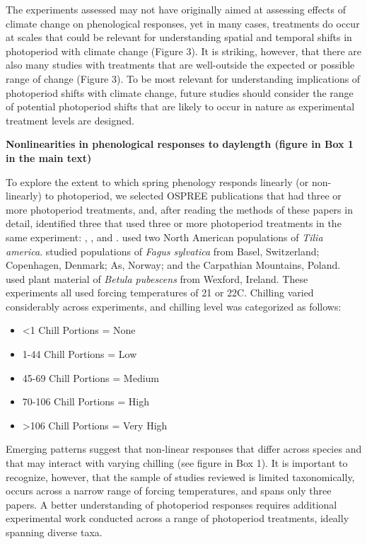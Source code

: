 \documentclass{article}
\begin{document}
\par The experiments assessed may not have originally aimed at assessing effects of climate change on phenological responses, yet in many cases, treatments do occur at scales that could be relevant for understanding spatial and temporal shifts in photoperiod with climate change (Figure 3). It is striking, however, that there are also many studies with treatments that are well-outside the expected or possible range of change (Figure 3).  To be most relevant for understanding implications of photoperiod shifts with climate change, future studies should consider the range of potential photoperiod shifts that are likely to occur in nature as experimental treatment levels are designed.

\par \textbf{Nonlinearities in phenological responses to daylength (figure in Box 1 in the main text)}
\par To explore the extent to which spring phenology responds linearly (or non-linearly) to photoperiod, we selected OSPREE publications that had three or more photoperiod treatments, and, after reading the methods of these papers in detail, identified three that used three or more photoperiod treatments in the same experiment: \citet{Ashby:1962aa}, \citet{Heide:1993a}, and \citet{Caffarra:2011b}. \citet{Ashby:1962aa} used two North American populations of \textit{Tilia america}. \citet{Heide:1993a} studied populations of \textit{Fagus sylvatica} from Basel, Switzerland; Copenhagen, Denmark; As, Norway; and the Carpathian Mountains, Poland. \citet{Caffarra:2011b} used plant material of \textit{Betula pubescens} from Wexford, Ireland. These experiments all used forcing temperatures of 21 or 22\degree C. Chilling varied considerably across experiments, and chilling level was categorized as follows:
\begin{itemize}
\item <1 Chill Portions = None
\item 1-44 Chill Portions = Low
\item 45-69 Chill Portions = Medium 
\item 70-106 Chill Portions = High
\item >106 Chill Portions = Very High
\end{itemize}

\par Emerging patterns suggest that non-linear responses that differ across species and that may interact with varying chilling (see figure in Box 1). It is important to recognize, however, that the sample of studies reviewed is limited taxonomically, occurs across a narrow range of forcing temperatures, and spans only three papers. A better understanding of photoperiod responses requires additional experimental work conducted across a range of photoperiod treatments, ideally spanning diverse taxa.
\end{document}
